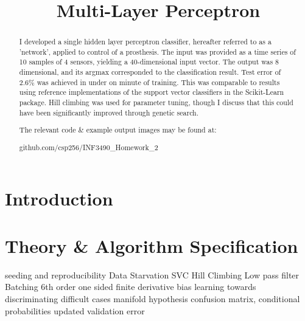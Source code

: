 \documentclass[10pt, conference, compsocconf]{IEEEtran}
\begin{document}
\title{Multi-Layer Perceptron}
\author{
}
\maketitle


\begin{abstract}
I developed a single hidden layer perceptron classifier, hereafter referred to as a 'network', applied to control of a prosthesis. The input was provided as a time series of 10 samples of 4 sensors, yielding a 40-dimensional input vector. The output was 8 dimensional, and its argmax corresponded to the classification result. Test error of 2.6\% was achieved in under on minute of training. This was comparable to results using reference implementations of the support vector classifiers in the Scikit-Learn package. Hill climbing was used for parameter tuning, though I discuss that this could have been significantly improved through genetic search.

The relevant code \& example output images may be found at: 

\centerline{github.com/csp256/INF3490\_Homework\_2}
\end{abstract}

\IEEEpeerreviewmaketitle


\section{Introduction}




\section{Theory \& Algorithm Specification}

seeding and reproducibility
Data Starvation
SVC
Hill Climbing
Low pass filter
Batching
6th order one sided finite derivative
bias learning towards discriminating difficult cases
manifold hypothesis
confusion matrix, conditional probabilities
updated validation error 
\end{document}
